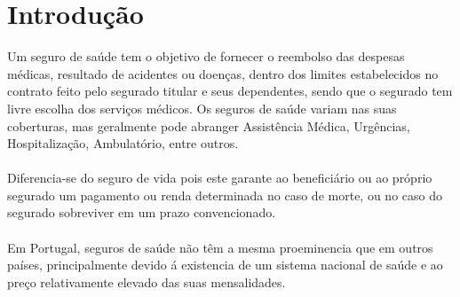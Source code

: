 \documentclass[11pt, a4paper]{article}
\begin{document}
\section{Introduç\~ao}
Um seguro de saúde tem o objetivo de fornecer o reembolso das despesas médicas, resultado de acidentes ou doenças, dentro dos limites estabelecidos no contrato feito pelo segurado titular e seus dependentes, sendo que o segurado tem livre escolha dos serviços médicos. Os seguros de saúde variam nas suas coberturas, mas geralmente pode abranger Assistência Médica, Urgências, Hospitalização, Ambulatório, entre outros.
\\
\\Diferencia-se do seguro de vida pois este garante ao beneficiário ou ao próprio segurado um pagamento ou renda determinada no caso de morte, ou no caso do segurado sobreviver em um prazo convencionado.
\\
\\Em Portugal, seguros de saúde n\~ao têm a mesma proeminencia que em outros países, principalmente devido á existencia de um sistema nacional de saúde e ao preço relativamente elevado das suas mensalidades.
\\
\\
\end{document}
